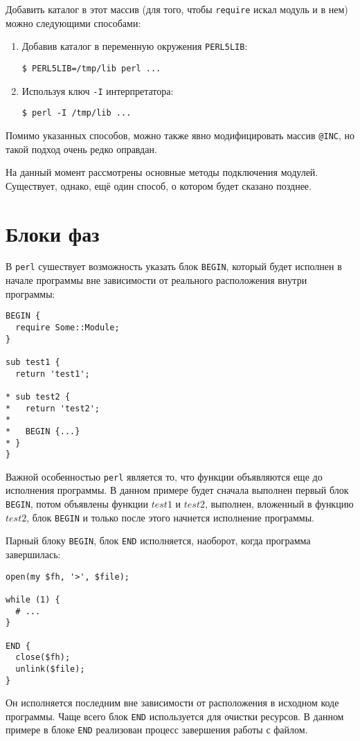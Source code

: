 Добавить каталог в этот массив (для того, чтобы \verb|require| искал модуль и в нем) можно следующими способами:
\begin{enumerate}
  \item Добавив каталог в переменную окружения \verb|PERL5LIB|:
    \begin{verbatim}
$ PERL5LIB=/tmp/lib perl ...
    \end{verbatim}
  \item Используя ключ \verb|-I| интерпретатора:
    \begin{verbatim}
$ perl -I /tmp/lib ...
    \end{verbatim}
\end{enumerate}
Помимо указанных способов, можно также явно модифицировать массив
\verb|@INC|, но такой подход очень редко оправдан.

На данный момент рассмотрены основные методы подключения модулей.
Существует, однако, ещё один способ, о котором будет сказано позднее.

\section{Блоки фаз} %
В \verb|perl| сушествует возможность указать блок \verb|BEGIN|, который будет исполнен в начале программы вне зависимости от реального расположения внутри программы:
\begin{verbatim}
BEGIN {
  require Some::Module;
}

sub test1 {
  return 'test1';

* sub test2 {
*   return 'test2';
*
*   BEGIN {...}
* }
}
\end{verbatim}
Важной особенностью \verb|perl| является то, что функции объявляются еще до исполнения программы. В данном примере будет сначала выполнен первый блок \verb|BEGIN|, потом объявлены функции $test1$ и $test2$, выполнен, вложенный в функцию $test2$, блок \verb|BEGIN| и только после этого начнется исполнение программы.

Парный блоку \verb|BEGIN|, блок \verb|END| исполняется, наоборот, когда программа завершилась:
\begin{verbatim}
open(my $fh, '>', $file);

while (1) {
  # ...
}

END {
  close($fh);
  unlink($file);
}
\end{verbatim}
Он исполняется последним вне зависимости от расположения в исходном коде программы. Чаще всего блок \verb|END| используется для очистки ресурсов. В данном примере в блоке \verb|END| реализован процесс завершения работы с файлом.


